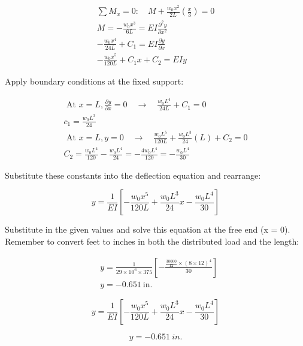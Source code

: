 \documentclass[
  letterpaper,
  DIV=11,
  numbers=noendperiod]{scrreprt}
\begin{document}
\begin{tcolorbox}
\begin{tcolorbox}
\[
\begin{gathered} \sum M_x=0: \quad M+\frac{w_0 x^2}{2 L}\left(\frac{x}{3}\right)=0 \\ M=-\frac{w_0 x^3}{6 L}=E I \frac{\partial^2 y}{\partial x^2} \\ -\frac{w_0 x^4}{24 L}+C_1=E I \frac{\partial y}{\partial x} \\ -\frac{w_0 x^5}{120 L}+C_1 x+C_2=EIy\end{gathered}
\]

Apply boundary conditions at the fixed support:

\[
\begin{gathered} \text { At } x=L, \frac{\partial y}{\partial x}=0 \quad \rightarrow \quad \frac{w_0 L^4}{24 L}+C_1=0
\\ c_1=\frac{w_0 L^3}{24}
\\ \text { At } x=L, y=0 \quad \rightarrow \quad \frac{w_0 L^5}{120 L}+\frac{w_0 L^3}{24}(L)+C_2=0
\\ C_2=\frac{w_0 L^4}{120}-\frac{w_0 L^4}{24}=-\frac{4 w_0 L^4}{120}=-\frac{w_0 L^4}{30} \end{gathered}
\]

Substitute these constants into the deflection equation and rearrange:

\[
y=\frac{1}{E I}\left[-\frac{w_0 x^5}{120L}+\frac{w_0 L^3}{24} x-\frac{w_0 L^4}{30}\right]
\]

Substitute in the given values and solve this equation at the free end
(x = 0). Remember to convert feet to inches in both the distributed load
and the length:

\[
\begin{aligned} & y=\frac{1}{29 \times 10^6 \times 375} \left[-\frac{\frac{30000}{12} \times (8\times12)^4}{30}\right] \\ & y=- 0.651 \mathrm{~in.}\end{aligned}
\]

\end{tcolorbox}

\begin{tcolorbox}[enhanced jigsaw, colback=white, colframe=quarto-callout-note-color-frame, leftrule=.75mm, opacitybacktitle=0.6, colbacktitle=quarto-callout-note-color!10!white, arc=.35mm, bottomrule=.15mm, breakable, title={Answer only}, left=2mm, titlerule=0mm, toptitle=1mm, toprule=.15mm, opacityback=0, rightrule=.15mm, coltitle=black, bottomtitle=1mm]

\[
y=\frac{1}{E I}\left[-\frac{w_0 x^5}{120L}+\frac{w_0 L^3}{24} x-\frac{w_0 L^4}{30}\right]
\]

\[
y=-0.651~in.
\]

\end{tcolorbox}

\end{tcolorbox}
\end{document}
